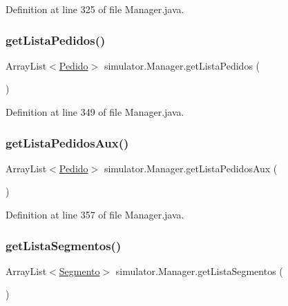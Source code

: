 Definition at line 325 of file Manager.\+java.

\mbox{\label{classsimulator_1_1_manager_a98f04170b85509ae8f1fe2753dac60ef}} 
\subsubsection{\texorpdfstring{get\+Lista\+Pedidos()}{getListaPedidos()}}
{\footnotesize\ttfamily Array\+List$<$\mbox{\hyperlink{classsimulator_1_1_pedido}{Pedido}}$>$ simulator.\+Manager.\+get\+Lista\+Pedidos (\begin{DoxyParamCaption}{ }\end{DoxyParamCaption})}



Definition at line 349 of file Manager.\+java.

\mbox{\label{classsimulator_1_1_manager_af266ad72ad536f9e58a75a3d070228cf}} 
\subsubsection{\texorpdfstring{get\+Lista\+Pedidos\+Aux()}{getListaPedidosAux()}}
{\footnotesize\ttfamily Array\+List$<$\mbox{\hyperlink{classsimulator_1_1_pedido}{Pedido}}$>$ simulator.\+Manager.\+get\+Lista\+Pedidos\+Aux (\begin{DoxyParamCaption}{ }\end{DoxyParamCaption})}



Definition at line 357 of file Manager.\+java.

\mbox{\label{classsimulator_1_1_manager_a8d708b20d559aa8fd42c9f963f2dc6d4}} 
\subsubsection{\texorpdfstring{get\+Lista\+Segmentos()}{getListaSegmentos()}}
{\footnotesize\ttfamily Array\+List$<$\mbox{\hyperlink{classsimulator_1_1_segmento}{Segmento}}$>$ simulator.\+Manager.\+get\+Lista\+Segmentos (\begin{DoxyParamCaption}{ }\end{DoxyParamCaption})}



